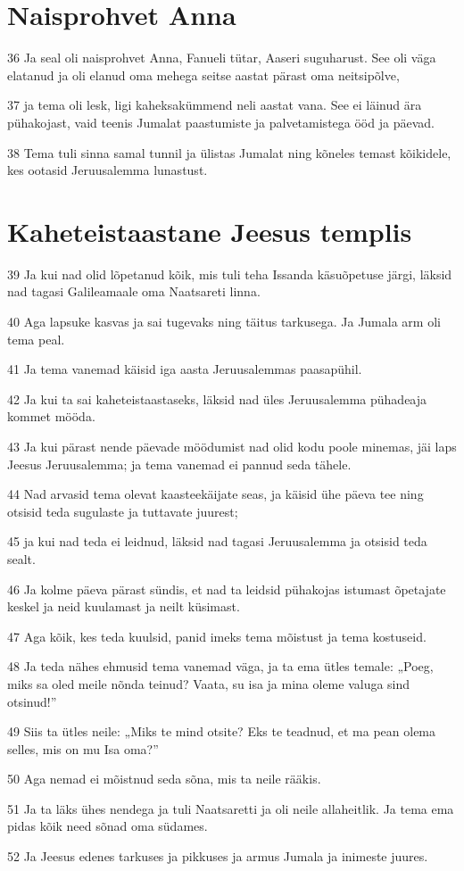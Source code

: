 \section*{Naisprohvet Anna}

\par 36 Ja seal oli naisprohvet Anna, Fanueli tütar, Aaseri suguharust. See oli väga elatanud ja oli elanud oma mehega seitse aastat pärast oma neitsipõlve,
\par 37 ja tema oli lesk, ligi kaheksakümmend neli aastat vana. See ei läinud ära pühakojast, vaid teenis Jumalat paastumiste ja palvetamistega ööd ja päevad.
\par 38 Tema tuli sinna samal tunnil ja ülistas Jumalat ning kõneles temast kõikidele, kes ootasid Jeruusalemma lunastust.

\section*{Kaheteistaastane Jeesus templis}

\par 39 Ja kui nad olid lõpetanud kõik, mis tuli teha Issanda käsuõpetuse järgi, läksid nad tagasi Galileamaale oma Naatsareti linna.
\par 40 Aga lapsuke kasvas ja sai tugevaks ning täitus tarkusega. Ja Jumala arm oli tema peal.
\par 41 Ja tema vanemad käisid iga aasta Jeruusalemmas paasapühil.
\par 42 Ja kui ta sai kaheteistaastaseks, läksid nad üles Jeruusalemma pühadeaja kommet mööda.
\par 43 Ja kui pärast nende päevade möödumist nad olid kodu poole minemas, jäi laps Jeesus Jeruusalemma; ja tema vanemad ei pannud seda tähele.
\par 44 Nad arvasid tema olevat kaasteekäijate seas, ja käisid ühe päeva tee ning otsisid teda sugulaste ja tuttavate juurest;
\par 45 ja kui nad teda ei leidnud, läksid nad tagasi Jeruusalemma ja otsisid teda sealt.
\par 46 Ja kolme päeva pärast sündis, et nad ta leidsid pühakojas istumast õpetajate keskel ja neid kuulamast ja neilt küsimast.
\par 47 Aga kõik, kes teda kuulsid, panid imeks tema mõistust ja tema kostuseid.
\par 48 Ja teda nähes ehmusid tema vanemad väga, ja ta ema ütles temale: „Poeg, miks sa oled meile nõnda teinud? Vaata, su isa ja mina oleme valuga sind otsinud!”
\par 49 Siis ta ütles neile: „Miks te mind otsite? Eks te teadnud, et ma pean olema selles, mis on mu Isa oma?”
\par 50 Aga nemad ei mõistnud seda sõna, mis ta neile rääkis.
\par 51 Ja ta läks ühes nendega ja tuli Naatsaretti ja oli neile allaheitlik. Ja tema ema pidas kõik need sõnad oma südames.
\par 52 Ja Jeesus edenes tarkuses ja pikkuses ja armus Jumala ja inimeste juures.


